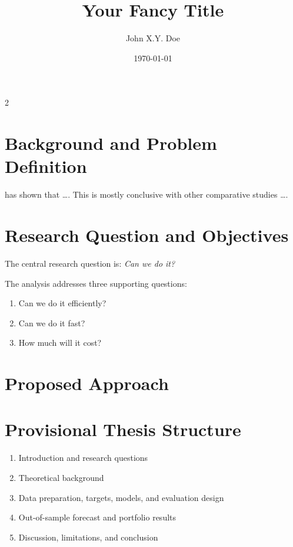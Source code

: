 \documentclass{expose}
\title{Your Fancy Title}
\author{John X.Y. Doe}
\date{\today}
\begin{document}
\maketitle

\begin{multicols}{2}
\section{Background and Problem Definition}

\textcite{Fama1970} has shown that \ldots.
This is mostly conclusive with other comparative studies \ldots \parencite{Heck2026}.

\section{Research Question and Objectives}

The central research question is:
\emph{Can we do it?}

The analysis addresses three supporting questions:
\begin{enumerate}
    \item Can we do it efficiently?
    \item Can we do it fast?
    \item How much will it cost?
\end{enumerate}

\lipsum

\section{Proposed Approach}

\lipsum

\section{Provisional Thesis Structure}

\begin{enumerate}
    \item Introduction and research questions
    \item Theoretical background
    \item Data preparation, targets, models, and evaluation design
    \item Out-of-sample forecast and portfolio results
    \item Discussion, limitations, and conclusion
\end{enumerate}

\end{multicols}
\clearpage
\makebibliography
\end{document}
